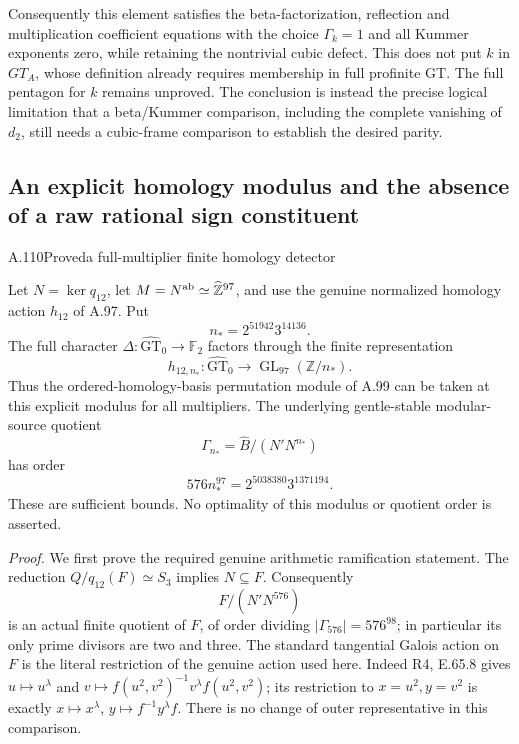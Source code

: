 Consequently this element satisfies the beta-factorization,
reflection and multiplication coefficient equations with the
choice $\Gamma_k=1$ and all Kummer exponents zero, while retaining
the nontrivial cubic defect. This does not put $k$ in $GT_A$,
whose definition already requires membership in full profinite GT.
The full pentagon for $k$ remains unproved. The conclusion is
instead the precise logical limitation that a beta/Kummer
comparison, including the complete vanishing of $d_2$, still
needs a cubic-frame comparison to establish the desired parity.

\subsection{An explicit homology modulus and the absence of a raw rational sign constituent}


\begin{statement}{A.110}{Proved}{a full-multiplier finite homology detector}
\end{statement}
Let $N=\ker q_{12}$, let $M=N^{\rm ab}\simeq
\widehat{\mathbb Z}^{97}$, and use the genuine normalized
homology action $h_{12}$ of A.97. Put
\[
                  \boxed{\ n_*=2^{51942}3^{14136}.\ }
\]
The full character $\Delta:\widehat{\mathrm{GT}}_0\to\mathbb F_2$
factors through the finite representation
\[
 h_{12,n_*}:\widehat{\mathrm{GT}}_0\longrightarrow
             \operatorname{GL}_{97}(\mathbb Z/n_*).
\]
Thus the ordered-homology-basis permutation module of A.99
can be taken at this explicit modulus for all multipliers.
The underlying gentle-stable modular-source quotient
\[
 \Gamma_{n_*}=\widehat B/(N'N^{n_*})
\]
has order
\[
       576n_*^{97}=2^{5038380}3^{1371194}.
\]
These are sufficient bounds. No optimality of this modulus
or quotient order is asserted.

\emph{Proof.}
We first prove the required genuine arithmetic ramification
statement. The reduction $Q/q_{12}(F)\simeq S_3$ implies
$N\subseteq F$. Consequently
\[
                 F/(N'N^{576})
\]
is an actual finite quotient of $F$, of order dividing
$|\Gamma_{576}|=576^{98}$; in particular its only prime
divisors are two and three. The standard tangential Galois
action on $F$ is the literal restriction of the genuine
action used here. Indeed R4, E.65.8 gives
$u\mapsto u^\lambda$ and
$v\mapsto f(u^2,v^2)^{-1}v^\lambda f(u^2,v^2)$; its
restriction to $x=u^2,y=v^2$ is exactly
$x\mapsto x^\lambda$, $y\mapsto f^{-1}y^\lambda f$.
There is no change of outer representative in this comparison.

